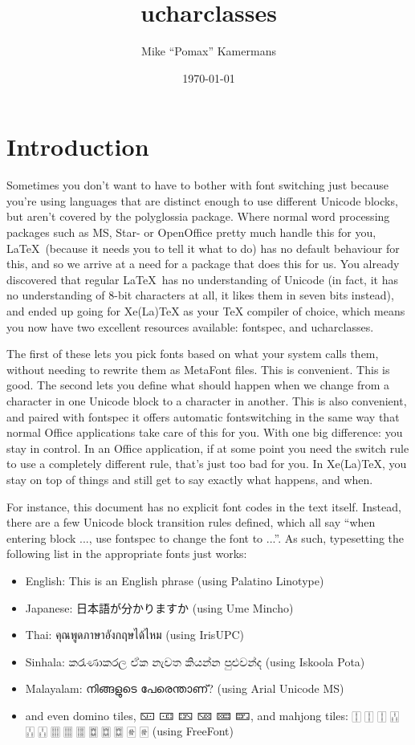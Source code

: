 ﻿\documentclass{article}
\newenvironment{itemlist}{%
  \begin{itemize}
	\setlength{\itemsep}{0pt}
	\setlength{\parsep}{0pt}
	\setlength{\topsep}{0pt}
	\setlength{\partopsep}{0pt}
	\setlength{\parskip}{0pt}
	\setlength{\labelsep}{5pt}}%
{
  \end{itemize}}
\begin{document}
	\title{ucharclasses}
	\author{Mike “Pomax” Kamermans}
	\date{\today}
	\maketitle

	\tableofcontents

	\pagebreak

	\section{Introduction}

		Sometimes you don't want to have to bother with font switching just because you're using languages that are distinct enough to use different Unicode blocks, but aren't covered by the polyglossia package. Where normal word processing packages such as MS, Star- or OpenOffice pretty much handle this for you, \LaTeX\ (because it needs you to tell it what to do) has no default behaviour for this, and so we arrive at a need for a package that does this for us. You already discovered that regular \LaTeX\ has no understanding of Unicode (in fact, it has no understanding of 8-bit characters at all, it likes them in seven bits instead), and ended up going for Xe(La)TeX as your TeX compiler of choice, which means you now have two excellent resources available: fontspec, and ucharclasses.

		The first of these lets you pick fonts based on what your system calls them, without needing to rewrite them as MetaFont files. This is convenient. This is good. The second lets you define what should happen when we change from a character in one Unicode block to a character in another. This is also convenient, and paired with fontspec it offers automatic fontswitching in the same way that normal Office applications take care of this for you. With one big difference: you stay in control. In an Office application, if at some point you need the switch rule to use a completely different rule, that's just too bad for you. In Xe(La)TeX, you stay on top of things and still get to say exactly what happens, and when.

		For instance, this document has no explicit font codes in the text itself. Instead, there are a few Unicode block transition rules defined, which all say “when entering block ..., use fontspec to change the font to ...”. As such, typesetting the following list in the appropriate fonts just works:

		\begin{itemlist}
			\item English: This is an English phrase (using Palatino Linotype)
			\item Japanese: 日本語が分かりますか (using Ume Mincho)
			\item Thai: คุณพูดภาษาอังกฤษได้ไหม (using IrisUPC)
			\item Sinhala: කරැණාකරල ඒක නැවත කියන්න පුළුවන්ද (using Iskoola Pota)
			\item Malayalam: നിങ്ങളുടെ പേരെന്താണ്? (using Arial Unicode MS)
			\item and even domino tiles, 🁇 🀼 🁐 🁋 🁚 🁝, and mahjong tiles: 🀑 🀑 🀑 🀒 🀒 🀒 🀕 🀕 🀕 🀗 🀗 🀗 🀅 🀅 (using FreeFont)
		\end{itemlist}
\end{document}
